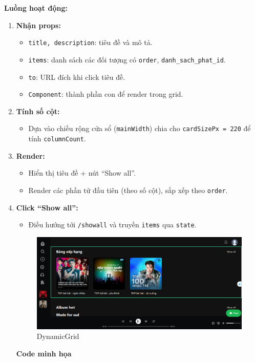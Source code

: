 \textbf{Luồng hoạt động:}
\begin{enumerate}
  \item \textbf{Nhận props:}
  \begin{itemize}
    \item \texttt{title, description}: tiêu đề và mô tả.
    \item \texttt{items}: danh sách các đối tượng có \texttt{order}, \texttt{danh\_sach\_phat\_id}.
    \item \texttt{to}: URL đích khi click tiêu đề.
    \item \texttt{Component}: thành phần con để render trong grid.
  \end{itemize}

  \item \textbf{Tính số cột:}
  \begin{itemize}
    \item Dựa vào chiều rộng cửa sổ (\texttt{mainWidth}) chia cho \texttt{cardSizePx = 220} để tính \texttt{columnCount}.
  \end{itemize}

  \item \textbf{Render:}
  \begin{itemize}
    \item Hiển thị tiêu đề + nút ``Show all''.
    \item Render các phần tử đầu tiên (theo số cột), sắp xếp theo \texttt{order}.
  \end{itemize}

  \item \textbf{Click ``Show all'':}
  \begin{itemize}
    \item Điều hướng tới \texttt{/showall} và truyền \texttt{items} qua \texttt{state}.
  \end{itemize}
  \begin{figure}[H]
    \centering
    \includegraphics[width=1\textwidth]{imgs/trienkhaife/dynamic.png}
    \caption{DynamicGrid}
  \end{figure}
  \textbf{Code minh họa}


\end{enumerate}
